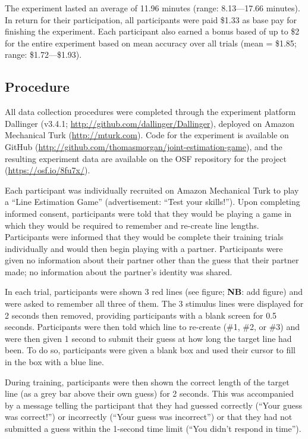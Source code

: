\documentclass[10pt, letterpaper]{article}
\begin{document}
The experiment lasted an average of 11.96 minutes (range: 8.13---17.66
minutes). In return for their participation, all participants were paid
\$1.33 as base pay for finishing the experiment. Each participant also
earned a bonus based of up to \$2 for the entire experiment based on
mean accuracy over all trials (mean = \$1.85; range: \$1.72---\$1.93).

\subsection{Procedure}\label{procedure}

All data collection procedures were completed through the experiment
platform Dallinger (v3.4.1;
\url{http://github.com/dallinger/Dallinger}), deployed on Amazon
Mechanical Turk (\url{http://mturk.com}). Code for the experiment is
available on GitHub
(\url{http://github.com/thomasmorgan/joint-estimation-game}), and the
resulting experiment data are available on the OSF repository for the
project (\url{https://osf.io/8fu7x/}).

Each participant was individually recruited on Amazon Mechanical Turk to
play a ``Line Estimation Game'' (advertisement: ``Test your skills!'').
Upon completing informed consent, participants were told that they would
be playing a game in which they would be required to remember and
re-create line lengths. Participants were informed that they would be
complete their training trials individually and would then begin playing
with a partner. Participants were given no information about their
partner other than the guess that their partner made; no information
about the partner's identity was shared.

In each trial, participants were shown 3 red lines (see figure;
\textbf{NB}: add figure) and were asked to remember all three of them.
The 3 stimulus lines were displayed for 2 seconds then removed,
providing participants with a blank screen for 0.5 seconds. Participants
were then told which line to re-create (\#1, \#2, or \#3) and were then
given 1 second to submit their guess at how long the target line had
been. To do so, participants were given a blank box and used their
cursor to fill in the box with a blue line.

During training, participants were then shown the correct length of the
target line (as a grey bar above their own guess) for 2 seconds. This
was accompanied by a message telling the participant that they had
guessed correctly (``Your guess was correct!'') or incorrectly (``Your
guess was incorrect'') or that they had not submitted a guess within the
1-second time limit (``You didn't respond in time'').
\end{document}
